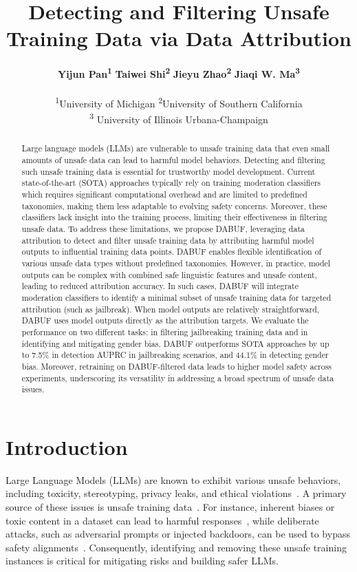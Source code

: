 \documentclass[11pt]{article}
\title{Detecting and Filtering Unsafe Training Data via Data Attribution}
\author{
 \textbf{Yijun Pan\textsuperscript{1}}
 \textbf{Taiwei Shi\textsuperscript{2}}
 \textbf{Jieyu Zhao\textsuperscript{2}}
 \textbf{Jiaqi W. Ma\textsuperscript{3}}
\\
\\
 \textsuperscript{1}University of Michigan
 \textsuperscript{2}University of Southern California \\
 \textsuperscript{3} University of Illinois Urbana-Champaign
\\
}
\begin{document}
\maketitle
\begin{abstract}
Large language models (LLMs) are vulnerable to unsafe training data that even  small amounts of unsafe data  can lead to harmful model behaviors. Detecting and filtering such unsafe training data is essential for trustworthy model development. Current state-of-the-art (SOTA) approaches typically rely on training moderation classifiers which requires significant computational overhead and are limited to predefined taxonomies, making them less adaptable to evolving safety concerns.
Moreover, these classifiers lack insight into the training process, limiting their effectiveness in filtering unsafe data.
To address these limitations, we propose DABUF, leveraging data attribution to detect and filter unsafe training data by attributing harmful model outputs to influential training data points. DABUF enables flexible identification of various unsafe data types without predefined taxonomies.
However, in practice, model outputs can be complex with combined safe linguistic features and unsafe content, leading to reduced attribution accuracy. In such cases, DABUF will integrate moderation classifiers to  identify a minimal subset of unsafe training data for targeted attribution (such as jailbreak).
When model outputs are relatively straightforward, DABUF uses model outputs directly as the attribution targets. We evaluate the performance on two different tasks: in filtering jailbreaking training data and in identifying and mitigating gender bias. DABUF outperforms SOTA approaches by up to 7.5\% in detection AUPRC in jailbreaking scenarios, and 44.1\% in detecting gender bias.
Moreover, retraining on DABUF-filtered data leads to higher model safety across experiments, underscoring its versatility in addressing a broad spectrum of unsafe data issues.
\end{abstract}

\section{Introduction}
Large Language Models (LLMs) are known to exhibit various unsafe behaviors, including toxicity, stereotyping, privacy leaks, and ethical violations~\citep{wang2024decodingtrustcomprehensiveassessmenttrustworthiness}. A primary source of these issues is unsafe training data~\citep{jiang2024turninggenerativemodelsdegenerate,chen2024susceptiblelargelanguagemodels}. For instance,  inherent biases or toxic content in a dataset can lead to harmful responses~\citep{jiang2024turninggenerativemodelsdegenerate, ouyang2022traininglanguagemodelsfollow}, while deliberate attacks, such as adversarial prompts or injected backdoors, can be used to bypass safety alignments~\citep{chen2024susceptiblelargelanguagemodels,zou2023universaltransferableadversarialattacks,li2024backdoorllmcomprehensivebenchmarkbackdoor}. Consequently, identifying and removing these unsafe training instances is critical for mitigating risks and building safer LLMs.
\end{document}
